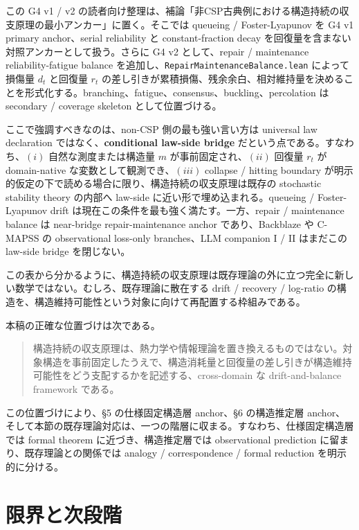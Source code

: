 \documentclass[12pt,a4paper]{article}
\begin{document}
この G4 v1 / v2 の読者向け整理は、補論「非CSP古典例における構造持続の収支原理の最小アンカー」に置く。そこでは queueing / Foster-Lyapunov を G4 v1 primary anchor、serial reliability と constant-fraction decay を回復量を含まない対照アンカーとして扱う。さらに G4 v2 として、repair / maintenance reliability-fatigue balance を追加し、\texttt{RepairMaintenanceBalance.lean} によって損傷量 \(d_{t}\) と回復量 \(r_{t}\) の差し引きが累積損傷、残余余白、相対維持量を決めることを形式化する。branching、fatigue、consensus、buckling、percolation は secondary / coverage skeleton として位置づける。

ここで強調すべきなのは、non-CSP 側の最も強い言い方は universal law declaration ではなく、\textbf{conditional law-side bridge} だという点である。すなわち、\((i)\) 自然な測度または構造量 \(m\) が事前固定され、\((ii)\) 回復量 \(r_{t}\) が domain-native な変数として観測でき、\((iii)\) collapse / hitting boundary が明示的仮定の下で読める場合に限り、構造持続の収支原理は既存の stochastic stability theory の内部へ law-side に近い形で埋め込まれる。queueing / Foster-Lyapunov drift は現在この条件を最も強く満たす。一方、repair / maintenance balance は near-bridge repair-maintenance anchor であり、Backblaze や C-MAPSS の observational loss-only branches、LLM companion I / II はまだこの law-side bridge を閉じない。

この表から分かるように、構造持続の収支原理は既存理論の外に立つ完全に新しい数学ではない。むしろ、既存理論に散在する drift / recovery / log-ratio の構造を、構造維持可能性という対象に向けて再配置する枠組みである。

本稿の正確な位置づけは次である。

\begin{quote}
構造持続の収支原理は、熱力学や情報理論を置き換えるものではない。対象構造を事前固定したうえで、構造消耗量と回復量の差し引きが構造維持可能性をどう支配するかを記述する、cross-domain な drift-and-balance framework である。
\end{quote}

この位置づけにより、§5 の仕様固定構造層 anchor、§6 の構造推定層 anchor、そして本節の既存理論対応は、一つの階層に収まる。すなわち、仕様固定構造層では formal theorem に近づき、構造推定層では observational prediction に留まり、既存理論との関係では analogy / correspondence / formal reduction を明示的に分ける。

\section{限界と次段階}\label{ux9650ux754cux3068ux6b21ux6bb5ux968e}
\end{document}
